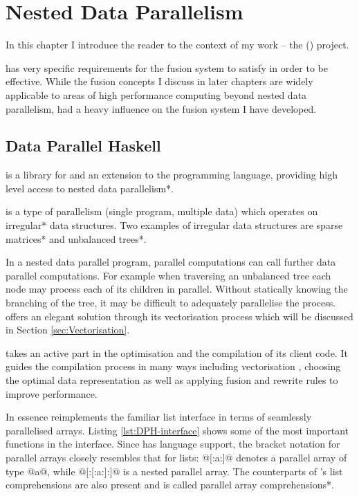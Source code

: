 \documentclass[preamble.tex]{subfiles}
\begin{document}
\clearpage

\chapter{Nested Data Parallelism}
\label{ch:NDP}

In this chapter I introduce the reader to the context of my work -- the  (\DPH) project.\idph

\DPH has very specific requirements for the fusion system to satisfy in order to be effective. While the fusion concepts I discuss in later chapters are widely applicable to areas of high performance computing beyond nested data parallelism, \DPH had a heavy influence on the fusion system I have developed.


\section{Data Parallel Haskell}
\label{sec:DPH}

\idph is a library for and an extension to the \Haskell programming language, providing high level access to \*nested data parallelism*.

\indp is a type of  parallelism (single program, multiple data) which operates on \*irregular* data structures. Two examples of irregular data structures are \*sparse matrices* and \*unbalanced trees*.

In a nested data parallel program, parallel computations can call further data parallel computations. For example when traversing an unbalanced tree each node may process each of its children in parallel. Without statically knowing the branching of the tree, it may be difficult to adequately parallelise the process. \DPH offers an elegant solution through its vectorisation process which will be discussed in Section \ref{sec:Vectorisation}.

\DPH takes an active part in the optimisation and the compilation of its client code. It guides the compilation process in many ways including vectorisation \cite{PLKC08}, choosing the optimal data representation \cite{InstantGenerics} as well as applying fusion \cite{CLP+07} and rewrite rules \cite{PTH01} to improve performance.

In essence \DPH reimplements the familiar list interface in terms of seamlessly parallelised arrays. Listing \ref{lst:DPH-interface} shows some of the most important functions in the \DPH interface. Since \DPH has language support, the bracket notation for parallel arrays closely resembles that for \Haskell lists: @[:a:]@ denotes a parallel array of type @a@, while @[:[:a:]:]@ is a nested parallel array. The counterparts of \Haskell's list comprehensions are also present and is called \*parallel array comprehensions*.
\end{document}
